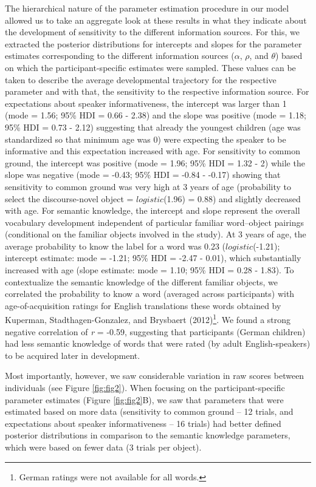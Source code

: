 \documentclass[
  man,floatsintext]{apa6}
\begin{document}
The hierarchical nature of the parameter estimation procedure in our model allowed us to take an aggregate look at these results in what they indicate about the development of sensitivity to the different information sources. For this, we extracted the posterior distributions for intercepts and slopes for the parameter estimates corresponding to the different information sources (\(\alpha\), \(\rho\), and \(\theta\)) based on which the participant-specific estimates were sampled. These values can be taken to describe the average developmental trajectory for the respective parameter and with that, the sensitivity to the respective information source. For expectations about speaker informativeness, the intercept was larger than 1 (mode = 1.56; 95\% HDI = 0.66 - 2.38) and the slope was positive (mode = 1.18; 95\% HDI = 0.73 - 2.12) suggesting that already the youngest children (age was standardized so that minimum age was 0) were expecting the speaker to be informative and this expectation increased with age. For sensitivity to common ground, the intercept was positive (mode = 1.96; 95\% HDI = 1.32 - 2) while the slope was negative (mode = -0.43; 95\% HDI = -0.84 - -0.17) showing that sensitivity to common ground was very high at 3 years of age (probability to select the discourse-novel object = \(logistic\)(1.96) = 0.88) and slightly decreased with age. For semantic knowledge, the intercept and slope represent the overall vocabulary development independent of particular familiar word--object pairings (conditional on the familiar objects involved in the study). At 3 years of age, the average probability to know the label for a word was 0.23 (\(logistic\)(-1.21); intercept estimate: mode = -1.21; 95\% HDI = -2.47 - 0.01), which substantially increased with age (slope estimate: mode = 1.10; 95\% HDI = 0.28 - 1.83). To contextualize the semantic knowledge of the different familiar objects, we correlated the probability to know a word (averaged across participants) with age-of-acquisition ratings for English translations these words obtained by Kuperman, Stadthagen-Gonzalez, and Brysbaert (2012)\footnote{German ratings were not available for all words.}. We found a strong negative correlation of \emph{r} = -0.59, suggesting that participants (German children) had less semantic knowledge of words that were rated (by adult English-speakers) to be acquired later in development.

Most importantly, however, we saw considerable variation in raw scores between individuals (see Figure \ref{fig:fig2}). When focusing on the participant-specific parameter estimates (Figure \ref{fig:fig2}B), we saw that parameters that were estimated based on more data (sensitivity to common ground -- 12 trials, and expectations about speaker informativeness -- 16 trials) had better defined posterior distributions in comparison to the semantic knowledge parameters, which were based on fewer data (3 trials per object).
\end{document}
